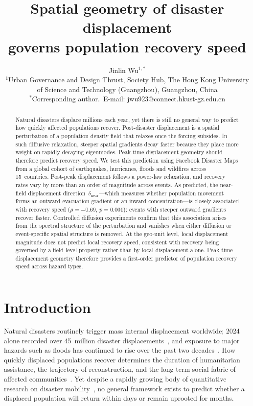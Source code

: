 \documentclass[11pt]{article}
\title{Spatial geometry of disaster displacement\\
governs population recovery speed}
\author{
  Jinlin Wu$^{1,\ast}$
  \\[6pt]
  {\small $^{1}$Urban Governance and Design Thrust, Society Hub, The Hong Kong University of Science and Technology (Guangzhou), Guangzhou, China}\\
  {\small $^{\ast}$Corresponding author.\ E-mail: jwu923@connect.hkust-gz.edu.cn}
}
\date{}
\newcommand{\dnear}{\delta_{\mathrm{near}}}
\newcommand{\rhosp}{\rho}
\begin{document}
\maketitle
\thispagestyle{empty}

\begin{abstract}
\noindent
  Natural disasters displace millions each year, yet there is still no
  general way to predict how quickly affected populations recover.
  Post-disaster displacement is a spatial perturbation of a population
  density field that relaxes once the forcing subsides. In such
  diffusive relaxation, steeper spatial gradients decay faster because
  they place more weight on rapidly decaying eigenmodes. Peak-time
  displacement geometry should therefore predict recovery speed.
  We test this prediction
  using Facebook Disaster Maps from a global cohort of earthquakes,
  hurricanes, floods and wildfires across 15~countries. Post-peak
  displacement follows a power-law relaxation, and recovery rates vary
  by more than an order of magnitude across events. As predicted, the
  near-field displacement direction~$\dnear$---which measures whether
  population movement forms an outward evacuation gradient or an inward
  concentration---is closely associated with recovery speed ($\rhosp =
  -0.69$, $p = 0.001$): events with steeper outward gradients recover
  faster. Controlled diffusion experiments confirm that this
  association arises from the spectral structure of the perturbation
  and vanishes when either diffusion or event-specific spatial
  structure is removed. At the geo-unit level, local displacement
  magnitude does not predict local recovery speed, consistent with
  recovery being governed by a field-level property rather than by
  local displacement alone. Peak-time displacement geometry therefore
  provides a first-order predictor of population recovery speed across
  hazard types.
\end{abstract}

\bigskip

\section*{Introduction}
\label{sec:intro}

Natural disasters routinely trigger mass internal displacement worldwide; 2024 alone recorded over 45~million disaster displacements~\citep{IDMC2025}, and exposure to major hazards such as floods has continued to rise over the past two decades~\citep{Tellman2021}. How quickly displaced populations recover determines the duration of humanitarian assistance, the trajectory of reconstruction, and the long-term social fabric of affected communities~\citep{Aldrich2012,Cutter2003}. Yet despite a rapidly growing body of quantitative research on disaster mobility~\citep{Lu2012,Yabe2020,Huang2025}, no general framework exists to predict whether a displaced population will return within days or remain uprooted for months.
\end{document}
